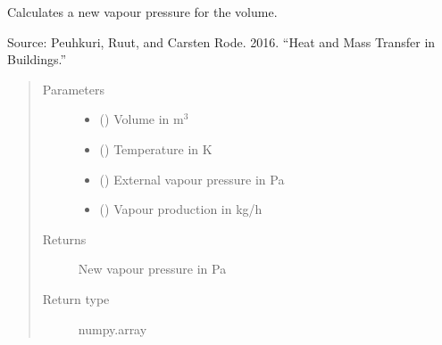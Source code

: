 \documentclass[letterpaper,10pt,english]{sphinxmanual}
\begin{document}
\begin{fulllineitems}
\label{\detokenize{air:livestock.air.new_mean_vapour_pressure}}
Calculates a new vapour pressure for the volume.

Source: Peuhkuri, Ruut, and Carsten Rode. 2016.
“Heat and Mass Transfer in Buildings.”
\begin{quote}\begin{description}
\item[{Parameters}] \leavevmode\begin{itemize}
\item {} 
 () \textendash{} Volume in m$^{\text{3}}$

\item {} 
 () \textendash{} Temperature in K

\item {} 
 () \textendash{} External vapour pressure in Pa

\item {} 
 () \textendash{} Vapour production in kg/h

\end{itemize}

\item[{Returns}] \leavevmode
New vapour pressure in Pa

\item[{Return type}] \leavevmode
numpy.array

\end{description}\end{quote}

\end{fulllineitems}

\end{document}
